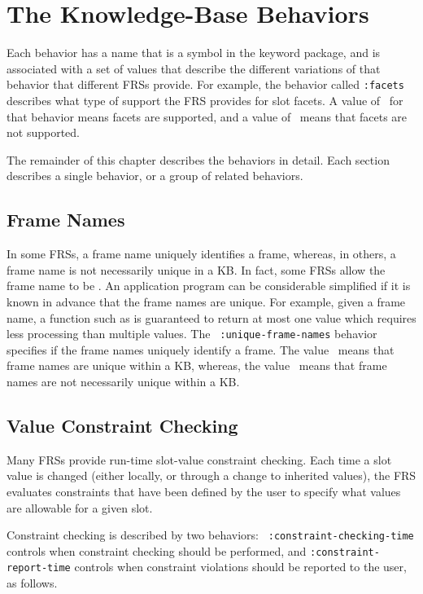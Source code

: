 \chapter{The Knowledge-Base Behaviors}
\label{ch:behaviors}

Each behavior has a name that is a symbol in the keyword package, and
is associated with a set of values that describe the different
variations of that behavior that different FRSs provide.  For example,
the behavior called {\tt :facets} describes what type of support the
FRS provides for slot facets.  A value of \true\ for that behavior means
facets are supported, and a value of \false\ means that facets are not
supported. 

The remainder of this chapter describes the behaviors in detail.  Each
section describes a single behavior, or a group of related behaviors.

\section{Frame Names}

In some FRSs, a frame name uniquely identifies a frame, whereas, in
others, a frame name is not necessarily unique in a KB.  In fact, some FRSs
allow the frame name to be \false.  An application program can be
considerable simplified if it is known in advance that the frame names
are unique.  For example, given a frame name, a function such as
 is guaranteed to return at most one value
which requires less processing than multiple values. The {\tt
:unique-frame-names} behavior specifies if the frame names uniquely
identify a frame.  The value \true\ means that frame names are unique
within a KB, whereas, the value \false\ means that frame names are not
necessarily unique within a KB.

\section{Value Constraint Checking}

Many FRSs provide run-time slot-value constraint checking.  Each time
a slot value is changed (either locally, or through a change to
inherited values), the FRS evaluates constraints that have been
defined by the user to specify what values are allowable for a given
slot.

Constraint checking is described by two behaviors: {\tt
:constraint-checking-time} controls when constraint checking should be
performed, and  {\tt :constraint-report-time} controls when
constraint violations should be reported to the user, as follows.

